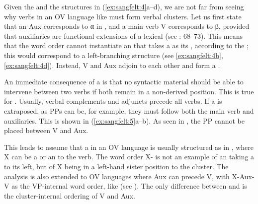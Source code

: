 \documentclass[output=paper, colorlinks, citecolor=brown]{langscibook}
\begin{document}
         

Given the  and the structures in (\ref{ex:sangfelt:4}a–d), we are not far from seeing why verbs in an OV language like  must form verbal clusters. Let us first state that an  Aux corresponds to α in , and a main verb V corresponds to β, provided that auxiliaries are functional extensions of a lexical  (see \citealt{Haider2013}: 68–73). This means that the  word order  cannot instantiate an  that takes a  as its , according to the ; this would correspond to a left-branching structure (see \ref{ex:sangfelt:4b}, \ref{ex:sangfelt:4d}). Instead, V and Aux adjoin to each other and form a .

An immediate consequence of a  is that no syntactic material should be able to intervene between two verbs if both remain in a non-derived position. This is true for . Usually, verbal complements and adjuncts precede all verbs. If a  is extraposed, as PPs can be, for example, they must follow both the main verb and auxiliaries. This is shown in (\ref{ex:sangfelt:5}a–b). As seen in , the PP cannot be placed between V and Aux.


\ea {}\label{ex:sangfelt:5}

\z 
\z 

This leads \textcites{Haider2003}[17–18, 335–343]{Haider2010}[90–93, 132–135]{Haider2013} to assume that a  in an OV language is usually structured as in , where X can be a  or an  to the verb. The word order X- is not an example of an  taking a   to its left, but of X being in a left-hand sister position to the cluster. The analysis is also extended to OV languages where Aux can precede V, with X-Aux-V as the VP-internal word order, like  (see \cites[341–343]{Haider2010}[133]{Haider2013}). The only difference between  and  is the cluster-internal ordering of V and Aux.
\end{document}
